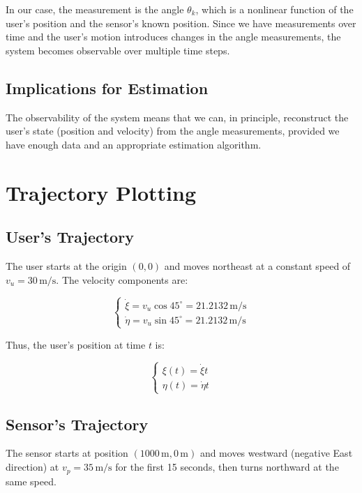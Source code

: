 \documentclass[12pt]{article}
\begin{document}
In our case, the measurement is the angle \( \theta_k \), which is a nonlinear function of the user's position and the sensor's known position. Since we have measurements over time and the user's motion introduces changes in the angle measurements, the system becomes observable over multiple time steps.

\subsection{Implications for Estimation}

The observability of the system means that we can, in principle, reconstruct the user's state (position and velocity) from the angle measurements, provided we have enough data and an appropriate estimation algorithm.

\section{Trajectory Plotting}

\subsection{User's Trajectory}

The user starts at the origin \( (0, 0) \) and moves northeast at a constant speed of \( v_u = 30\, \text{m/s} \). The velocity components are:

\[
\begin{cases}
\dot{\xi} = v_u \cos 45^\circ = 21.2132\, \text{m/s} \\
\dot{\eta} = v_u \sin 45^\circ = 21.2132\, \text{m/s}
\end{cases}
\]

Thus, the user's position at time \( t \) is:

\[
\begin{cases}
\xi(t) = \dot{\xi} t \\
\eta(t) = \dot{\eta} t
\end{cases}
\]

\subsection{Sensor's Trajectory}

The sensor starts at position \( (1000\, \text{m}, 0\, \text{m}) \) and moves westward (negative East direction) at \( v_p = 35\, \text{m/s} \) for the first 15 seconds, then turns northward at the same speed.
\end{document}
